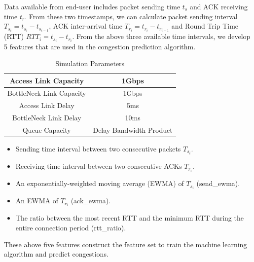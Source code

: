 \par Data available from end-user includes packet sending time $t_{s}$ and ACK receiving time $t_{r}$. From these two timestamps, we can calculate packet sending interval $T_{s_{i}} = t_{s_{i}} - t_{s_{i-1}}$, ACK inter-arrival time $T_{r_{i}} = t_{r_{i}} - t_{r_{i-1}}$ and Round Trip Time (RTT) $RTT_{i} = t_{s_{i}} - t_{r_{i}}$. From the above three available time intervals, we develop 5 features that are used in the congestion prediction algorithm.
\begin{table}
\begin{center}
\caption {Simulation Parameters} \label{tab:simuPara}
\begin{tabular}{ |c|c| }
 \hline
 Access Link Capacity & 1Gbps  \\
 \hline
 BottleNeck Link Capacity & 1Gbps  \\
 \hline
 Access Link Delay & 5ms  \\
 \hline
 BottleNeck Link Delay & 10ms\\
 \hline
 Queue Capacity & Delay-Bandwidth Product\\
 \hline
\end{tabular}
\end{center}
\end{table}
\begin{itemize}
\item Sending time interval between two consecutive packets $T_{s_{i}}$.
\item Receiving time interval between two consecutive ACKs $T_{r_{i}}$.
\item An exponentially-weighted moving average (EWMA) of $T_{s_{i}}$ (send\_ewma).
\item An EWMA of $T_{r_{i}}$ (ack\_ewma).
\item The ratio between the most recent RTT and the minimum RTT during the entire connection period (rtt\_ratio).
\end{itemize}

These above five features construct the feature set to train the machine learning algorithm and predict congestions.

